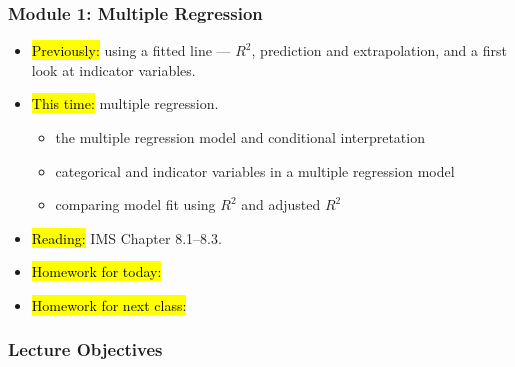

\begin{frame}
\frametitle{Module 1: Multiple Regression}
    \begin{itemize}
    \item \hl{Previously:} using a fitted line --- $R^2$, prediction and extrapolation, and a first look at indicator variables.
    \item \hl{This time:} multiple regression.
      \begin{itemize}
      \item the multiple regression model and conditional interpretation
      \item categorical and indicator variables in a multiple regression model
      \item comparing model fit using $R^2$ and adjusted $R^2$
      \end{itemize}
    \item \hl{Reading:} IMS Chapter 8.1--8.3.
    \item \hl{Homework for today:}
    \item \hl{Homework for next class:}
    \end{itemize}
\end{frame}


\begin{frame}
    \frametitle{Lecture Objectives}
\end{frame}

    